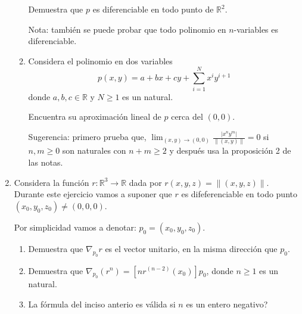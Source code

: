 \documentclass{article}
\theoremstyle{definition}
\begin{document}
\begin{enumerate}
\begin{enumerate}
              Demuestra que $p$ es diferenciable en todo punto de $\mathbb{R}^2$.

              
              Nota: tambi\'en se puede probar que todo polinomio en $n$-variables es diferenciable.
              
            \item Considera el polinomio en dos variables
              $$p(x,y)= a + bx+ cy + \sum_{i=1}^N x^{i}y^{i+1}$$
              donde $a,b,c\in \mathbb{R}$ y $N\geq 1$ es un natural.
              
              Encuentra su aproximaci\'on lineal de $p$ cerca del $(0,0)$.

              Sugerencia: primero prueba que, $\lim_{(x,y)\to (0,0)} \frac{|x^ny^m|}{\|(x,y)\|}=0$ si
              $n,m\geq0$ son naturales con $n+m\geq 2$ y despu\'es usa la proposici\'on 2 de las notas.
            \end{enumerate}

            
             \item Considera  la funci\'on  $r:\mathbb{R}^3 \to \mathbb{R}$ dada por $r(x,y,z)=\|(x,y,z)\|$. Durante
            este ejercicio vamos a suponer que $r$ es difeferenciable en todo punto $(x_0,y_0,z_0)\ne (0,0,0)$.

            Por simplicidad vamos a denotar: $p_0=(x_0,y_0,z_0)$.
            \begin{enumerate}
            \item Demuestra que $\nabla_{p_0}r$ es el  vector unitario, en la misma direcci\'on que
              $p_0$.
            \item Demuestra que $\nabla_{p_0}(r^n)=[nr^{(n-2)}(x_0)]p_0$, donde $n \geq 1$ es un natural.
            \item La f\'ormula del inciso anterio \textquestiondown es v\'alida si $n$ es un entero negativo?
            \end{enumerate}
         

\end{enumerate}
\end{document}
